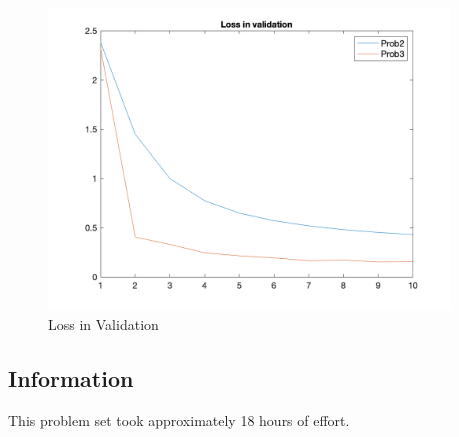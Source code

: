 \documentclass{article}
\newcommand{\info}{\clearpage \subsection*{Information}}
\begin{document}
\begin{figure}[!h]
  \centering
  \includegraphics[height=8cm]{plots/prob3lv.png}
  \caption{Loss in Validation}
\end{figure}

\info

This problem set took approximately 18 hours of effort.


\end{document}
